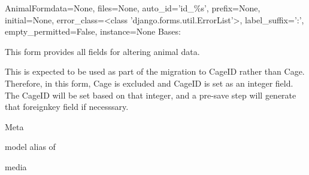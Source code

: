 \documentclass[letterpaper,10pt,english]{sphinxmanual}
\begin{document}
\hypertarget{animal.forms.AnimalForm}{}\begin{classdesc}{AnimalForm}{data=None, files=None, auto\_id='id\_\%s', prefix=None, initial=None, error\_class=\textless{}class 'django.forms.util.ErrorList'\textgreater{}, label\_suffix=':', empty\_permitted=False, instance=None}
Bases: 

This form provides all fields for altering animal data.

This is expected to be used as part of the migration to CageID rather than Cage.  Therefore, in this form, Cage is excluded and CageID is set as an integer field.
The CageID will be set based on that integer, and a pre-save step will generate that foreignkey field if necesssary.

\hypertarget{animal.forms.AnimalForm.Meta}{}\begin{classdesc}{Meta}{}~

\hypertarget{animal.forms.AnimalForm.Meta.model}{}\begin{memberdesc}{model}
alias of 
\end{memberdesc}
\end{classdesc}

\hypertarget{animal.forms.AnimalForm.media}{}\begin{memberdesc}[AnimalForm]{media}\end{memberdesc}
\end{classdesc}
\end{document}
